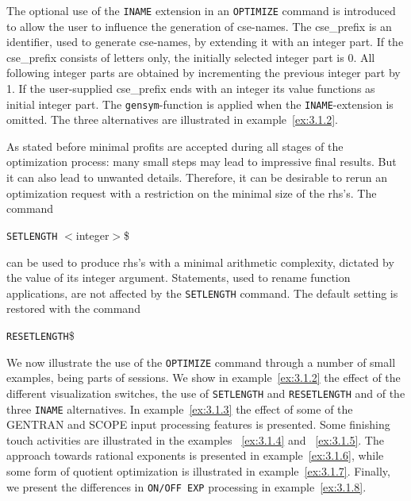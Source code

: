 The optional use of the {\tt INAME} extension in an {\tt OPTIMIZE} command
is introduced to allow the user to influence the generation of cse-names.
The cse\_prefix is an identifier, used to generate cse-names, by
extending it with an integer part. If the cse\_prefix consists of letters
only, the initially selected integer part is 0. All following integer parts are
obtained by incrementing the previous integer part by 1. If the user-supplied
cse\_prefix ends with an integer its value functions as initial integer part.
The {\tt gensym}-function is applied when the {\tt INAME}-extension is omitted.
The three alternatives are illustrated in example~\ref{ex:3.1.2}.

As stated before minimal profits are accepted during all stages of the
optimization process: many small steps may lead to impressive final results.
But it can also lead to unwanted details. Therefore, it can be desirable
to rerun an optimization request with a restriction on the minimal size of
the rhs's. The command

\hspace*{1cm} {\tt SETLENGTH} $<$integer$>$\$

can be used to produce rhs's with a minimal arithmetic complexity,
dictated by the value of
its integer argument. Statements, used to rename function applications, are
not affected by the {\tt SETLENGTH} command. The default setting is restored
with the command

\hspace*{1cm} {\tt RESETLENGTH}\$

We now illustrate the use of the {\tt OPTIMIZE} command through a number of
small examples, being parts of {\REDUCE} sessions. We show in
example~\ref{ex:3.1.2} the effect of the different visualization switches,
the use of {\tt SETLENGTH} and {\tt RESETLENGTH} and of the three {\tt INAME}
alternatives. In example~\ref{ex:3.1.3} the effect of some of the GENTRAN and
SCOPE input processing features is presented. Some finishing touch activities
are illustrated in the examples  ~\ref{ex:3.1.4} and ~\ref{ex:3.1.5}.
The approach towards rational exponents is presented in
example~\ref{ex:3.1.6}, while some form of quotient optimization is
illustrated in example~\ref{ex:3.1.7}. Finally, we present the differences
in {\tt ON/OFF EXP} processing in example~\ref{ex:3.1.8}.

\example\label{ex:3.1.2}

